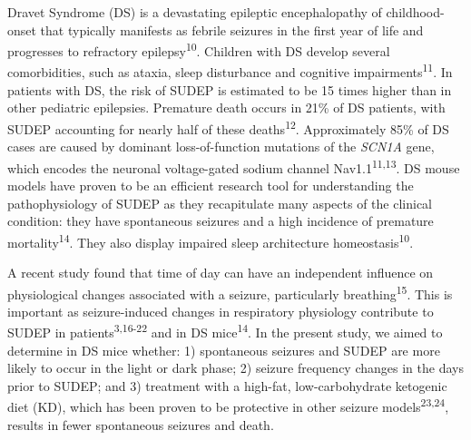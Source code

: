 \documentclass[]{article}
\begin{document}
Dravet Syndrome (DS) is a devastating epileptic encephalopathy of
childhood-onset that typically manifests as febrile seizures in the
first year of life and progresses to refractory
epilepsy\textsuperscript{10}. Children with DS develop several
comorbidities, such as ataxia, sleep disturbance and cognitive
impairments\textsuperscript{11}. In patients with DS, the risk of SUDEP
is estimated to be 15 times higher than in other pediatric epilepsies.
Premature death occurs in 21\% of DS patients, with SUDEP accounting for
nearly half of these deaths\textsuperscript{12}. Approximately 85\% of
DS cases are caused by dominant loss-of-function mutations of the
\emph{SCN1A} gene, which encodes the neuronal voltage-gated sodium
channel Nav1.1\textsuperscript{11,13}. DS mouse models have proven to be
an efficient research tool for understanding the pathophysiology of
SUDEP as they recapitulate many aspects of the clinical condition: they
have spontaneous seizures and a high incidence of premature
mortality\textsuperscript{14}. They also display impaired sleep
architecture homeostasis\textsuperscript{10}.

A recent study found that time of day can have an independent influence
on physiological changes associated with a seizure, particularly
breathing\textsuperscript{15}. This is important as seizure-induced
changes in respiratory physiology contribute to SUDEP in
patients\textsuperscript{3,16-22} and in DS mice\textsuperscript{14}. In
the present study, we aimed to determine in DS mice whether: 1)
spontaneous seizures and SUDEP are more likely to occur in the light or
dark phase; 2) seizure frequency changes in the days prior to SUDEP; and
3) treatment with a high-fat, low-carbohydrate ketogenic diet (KD),
which has been proven to be protective in other seizure
models\textsuperscript{23,24}, results in fewer spontaneous seizures and
death.
\end{document}
